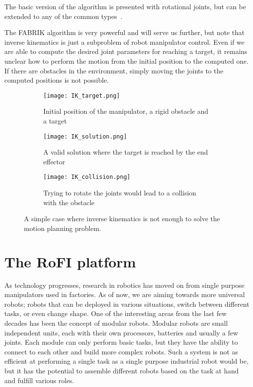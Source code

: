 The basic version of the algorithm is presented with rotational joints, but can be extended to any of the common types~\cite{fabrikConstraints}.

The FABRIK algorithm is very powerful and will serve us further, but note that inverse kinematics is just a subproblem of robot manipulator control. Even if we are able to compute the desired joint parameters for reaching a target, it remains unclear how to perform the motion from the initial position to the computed one. If there are obstacles in the environment, simply moving the joints to the computed positions is not possible.

\begin{figure}
\centering
\begin{subfigure}{.3\textwidth}
  \centering
  \texttt{[image: IK\_target.png]}
  \caption{Initial position of the manipulator, a rigid obstacle and a target}
\end{subfigure}%
\begin{subfigure}{.3\textwidth}
  \centering
  \texttt{[image: IK\_solution.png]}
  \caption{A valid solution where the target is reached by the end effector}
\end{subfigure}%
\begin{subfigure}{.3\textwidth}
  \centering
  \texttt{[image: IK\_collision.png]}
  \caption{Trying to rotate the joints would lead to a collision with the obstacle}
\end{subfigure}
\caption{A simple case where inverse kinematics is not enough to solve the motion planning problem.}\label{fig:ikcoll}
\end{figure}

\newpage
\section{The RoFI platform}

As technology progresses, research in robotics has moved on from single purpose manipulators used in factories. As of now, we are aiming towards more universal robots; robots that can be deployed in various situations, switch between different tasks, or even change shape. One of the interesting areas from the last few decades has been the concept of modular robots. Modular robots are small independent units, each with their own processors, batteries and usually a few joints. Each module can only perform basic tasks, but they have the ability to connect to each other and build more complex robots. Such a system is not as efficient at performing a single task as a single purpose industrial robot would be, but it has the potential to assemble different robots based on the task at hand and fulfill various roles.


